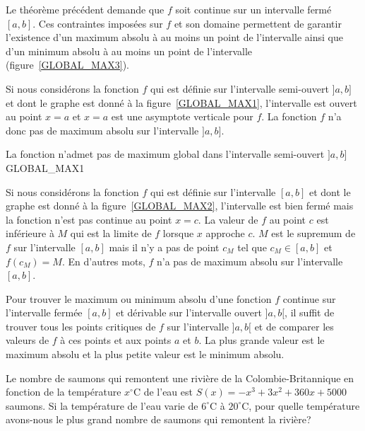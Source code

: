 {Le théorème précédent demande que $f$ soit continue sur un intervalle
fermé $[a,b]$.  Ces contraintes imposées sur $f$ et son domaine
permettent de garantir l'existence d'un maximum absolu à au moins 
un point de l'intervalle ainsi que d'un minimum absolu à au moins 
un point de l'intervalle (figure~\ref{GLOBAL_MAX3}).


Si nous considérons la fonction $f$ qui est définie sur l'intervalle
semi-ouvert $]a,b]$ et dont le graphe est donné à la
figure~\ref{GLOBAL_MAX1}, l'intervalle est ouvert au point $x=a$ et
$x=a$ est une asymptote verticale pour $f$.  La fonction $f$ n'a donc
pas de maximum absolu sur l'intervalle $]a,b]$.

{La fonction n'admet pas de maximum global dans l'intervalle
semi-ouvert $]a,b]$}{GLOBAL_MAX1} 

Si nous considérons la fonction $f$ qui est définie sur l'intervalle
$[a,b]$ et dont le graphe est donné à la figure~\ref{GLOBAL_MAX2},
l'intervalle est bien fermé mais la fonction n'est pas continue au
point $x=c$.  La valeur de $f$ au point $c$ est inférieure à $M$ qui
est la limite de $f$ lorsque $x$ approche $c$.  $M$ est le supremum de
$f$ sur l'intervalle $[a,b]$ mais il n'y a pas de point $c_M$ tel que
$c_M \in [a,b]$ et $f(c_M) = M$.  En d'autres mots, $f$ n'a pas de
maximum absolu sur l'intervalle $[a,b]$.


\begin{meth} \label{mthmaxth}
Pour trouver le maximum ou minimum absolu d'une fonction $f$ continue
sur l'intervalle fermée $[a,b]$ et dérivable sur l'intervalle ouvert
$]a,b[$, il suffit de trouver tous les points critiques de $f$ sur
l'intervalle $]a,b[$ et de comparer les valeurs de $f$ à ces points et
aux points $a$ et $b$.  La plus grande valeur est le maximum absolu et
la plus petite valeur est le minimum absolu.
\end{meth}

\begin{egg}
Le nombre de saumons qui remontent une rivière de la
Colombie-Britannique en fonction de la température $x^\circ$C de l'eau
est $S(x) = -x^3 + 3 x^2 +360 x + 5000$ saumons.  Si la température de
l'eau varie de $6^\circ$C à $20^\circ$C, pour quelle température
avons-nous le plus grand nombre de saumons qui remontent la rivière?


\end{egg}}
